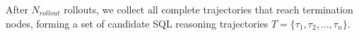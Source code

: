 After $N_{rollout}$ rollouts, we collect all complete trajectories that reach termination nodes, forming a set of candidate SQL reasoning trajectories $T = \{\tau_1, \tau_2, \dots, \tau_n\}$.


